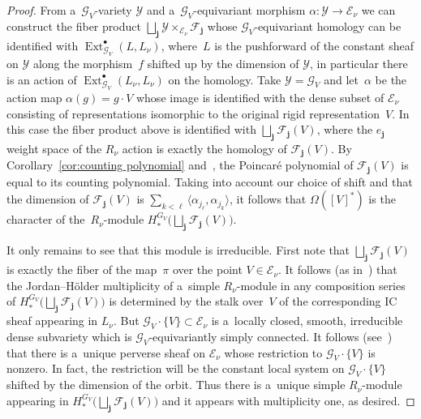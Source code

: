 \documentclass[pdftex]{sigma}
\numberwithin{equation}{section}
\begin{document}
\begin{proof}
From a~$\mathcal{G}_V$-variety $\mathcal{Y}$ and a~$\mathcal{G}_V$-equivariant morphism
$\alpha:\mathcal{Y}\to\mathcal{E}_\nu$ we can construct the f\/iber product $\bigsqcup_\mathbf{j}
\mathcal{Y}\times_{\mathcal{E}_\nu}\mathcal{F}_\mathbf{j}$ whose $\mathcal{G}_V$-equivariant homology can be identif\/ied
with $\operatorname{Ext}_{\mathcal{G}_V}^\bullet(L,L_\nu)$, where~$L$ is the pushforward of the constant sheaf on
$\mathcal{Y}$ along the morphism~$f$ shifted up by the dimension of $\mathcal{Y}$, in particular there is an action of
$\operatorname{Ext}_{\mathcal{G}_V}^\bullet(L_\nu,L_\nu)$ on the homology.
Take $\mathcal{Y}=\mathcal{G}_V$ and let~$\alpha$ be the action map $\alpha(g)=g\cdot V$ whose image is identif\/ied with
the dense subset of $\mathcal{E}_\nu$ consisting of representations isomorphic to the original rigid representation~$V$.
In this case the f\/iber product above is identif\/ied with $\bigsqcup_\mathbf{j} \mathcal{F}_\mathbf{j}(V)$, where the
$e_\mathbf{j}$ weight space of the $R_\nu$ action is exactly the homology of $\mathcal{F}_\mathbf{j}(V)$.
By Corollary~\ref{cor:counting polynomial} and~\cite[Theorem~6.1.2]{hausel-rodriguez}, the Poincar\'e polynomial of
$\mathcal{F}_\mathbf{j}(V)$ is equal to its counting polynomial.
Taking into account our choice of shift and that the dimension of $\mathcal{F}_\mathbf{j}(V)$ is
$\sum\limits_{k<\ell}\langle\alpha_{j_\ell},\alpha_{j_k}\rangle$, it follows that $\Omega([V]^*)$ is the character of
the~$R_\nu$-module $H_*^{G_V}\big(\bigsqcup_\mathbf{j} \mathcal{F}_\mathbf{j}(V)\big)$.

It only remains to see that this module is irreducible.
First note that $\bigsqcup_\mathbf{j} \mathcal{F}_\mathbf{j}(V)$ is exactly the f\/iber of the map~$\pi$ over the point
$V\in\mathcal{E}_\nu$.
It follows (as in~\cite[equation~(8.6.24)]{chriss-ginzburg}) that the Jordan--H\"older multiplicity of a~simple $R_\nu$-module
in any composition series of $H_*^{G_V}\big(\bigsqcup_\mathbf{j} \mathcal{F}_\mathbf{j}(V)\big)$ is determined by the stalk over~$V$ of the
corresponding IC sheaf appearing in $L_\nu$.
But \mbox{$\mathcal{G}_V\cdot \{V\}\subset\mathcal{E}_\nu$} is a~locally closed, smooth, irreducible dense subvariety which is
$\mathcal{G}_V$-equivariantly simply connected.
It follows (see~\cite[Section~1.5]{lusztig2}) that there is a~unique perverse sheaf on $\mathcal{E}_\nu$
whose restriction to $\mathcal{G}_V\cdot\{V\}$ is nonzero.
In fact, the restriction will be the constant local system on $\mathcal{G}_V\cdot \{V\}$ shifted by the dimension of the
orbit.
Thus there is a~unique simple $R_\nu$-module appearing in $H_*^{G_V}\big(\bigsqcup_\mathbf{j}
\mathcal{F}_\mathbf{j}(V)\big)$ and it appears with multiplicity one, as desired.
\end{proof}
\end{document}
